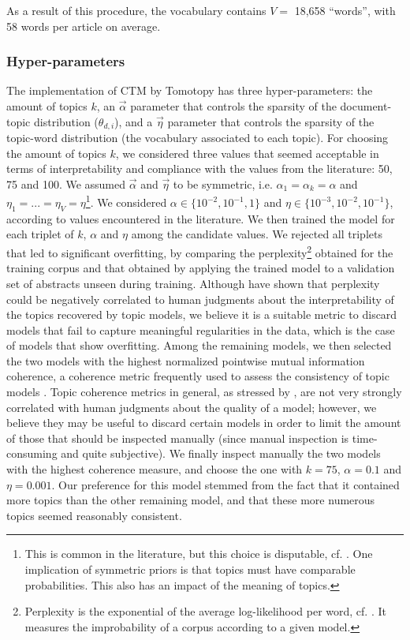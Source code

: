 \documentclass[smallextended]{svjour3}
\begin{document}
As a result of this procedure, the vocabulary contains $V=$ 18,658 ``words'', with 58 words per article on average.

\subsubsection{\label{appendix:hyper_parameter}Hyper-parameters}

The implementation of CTM by Tomotopy has three hyper-parameters: the amount of topics $k$, an $\vec{\alpha}$ parameter that controls the sparsity of the document-topic distribution ($\theta_{d,i}$), and a $\vec{\eta}$ parameter that controls the sparsity of the topic-word distribution (the vocabulary associated to each topic).
For choosing the amount of topics $k$, we considered three values that seemed acceptable in terms of interpretability and compliance with the values from the literature: 50, 75 and 100.
We assumed $\vec{\alpha}$ and $\vec{\eta}$ to be symmetric, i.e. $\alpha_1 = \alpha_k = \alpha$ and $\eta_1 = ... = \eta_V = \eta$\footnote{This is common in the literature, but this choice is disputable, cf. \citealt{Wallach2009}. One implication of symmetric priors is that topics must have comparable probabilities. This also has an impact of the meaning of topics.}. We considered  $\alpha \in \{10^{-2},10^{-1},1\}$ and $\eta \in \{10^{-3},10^{-2},10^{-1}\}$, according to values encountered in the literature.
We then trained the model for each triplet of $k$, $\alpha$ and $\eta$ among the candidate values. We rejected all triplets that led to significant overfitting, by comparing the perplexity\footnote{Perplexity is the exponential of the average log-likelihood per word, cf. \citealt{Blei2003}. It measures the improbability of a corpus according to a given model.} obtained for the training corpus and that obtained by applying the trained model to a validation set of abstracts unseen during training.
Although \citet{Chang2009} have shown that perplexity could be negatively correlated to human judgments about the interpretability of the topics recovered by topic models, we believe it is a suitable metric to discard models that fail to capture meaningful regularities in the data, which is the case of models that show overfitting. Among the remaining models, we then selected the two models with the highest normalized pointwise mutual information coherence, a coherence metric frequently used to assess the consistency of topic models \citep{hoyle2021is}. Topic coherence metrics in general, as stressed by \citeauthor{hoyle2021is}, are not very strongly correlated with human judgments about the quality of a model; however, we believe they may be useful to discard certain models in order to limit the amount of those that should be inspected manually (since manual inspection is time-consuming and quite subjective). We finally inspect manually the two models with the highest coherence measure, and choose the one with $k=75$, $\alpha=0.1$ and $\eta=0.001$. Our preference for this model stemmed from the fact that it contained more topics than the other remaining model, and that these more numerous topics seemed reasonably consistent.
\end{document}
